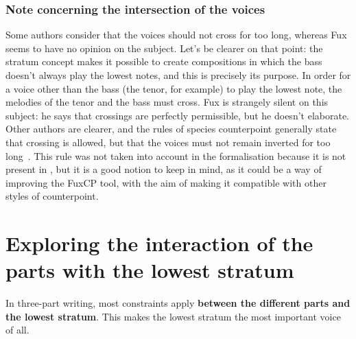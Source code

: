 \subsubsection{Note concerning the intersection of the voices}
Some authors consider that the voices should not cross for too long, whereas Fux seems to have no opinion on the subject. Let's be clearer on that point: the stratum concept makes it possible to create compositions in which the bass doesn't always play the lowest notes, and this is precisely its purpose. In order for a voice other than the bass (the tenor, for example) to play the lowest note, the melodies of the tenor and the bass must cross. Fux is strangely silent on this subject: he says that crossings are perfectly permissible, but he doesn't elaborate. Other authors are clearer, and the rules of species counterpoint generally state that crossing is allowed, but that the voices must not remain inverted for too long~\cite[p.28]{Bitsch}. This rule  was not taken into account in the formalisation because it is not present in \gap, but it is a good notion to keep in mind, as it could be a way of improving the FuxCP tool, with the aim of making it compatible with other styles of counterpoint.

\section{Exploring the interaction of the parts with the lowest stratum} \label{exploring-interaction-p-a}
In three-part writing, most constraints apply \textbf{between the different parts and the lowest stratum}. This makes the lowest stratum the most important voice of all.

